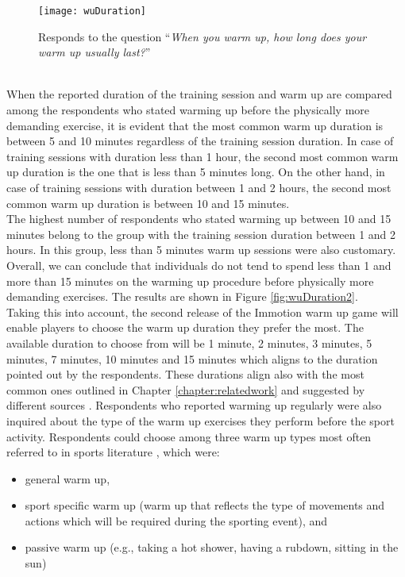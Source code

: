  \begin{figure}[h]
    \centering
    \texttt{[image: wuDuration]}
    \caption{ Responds to the question ``\textit{When you warm up, how long does your warm up usually last?}''}
    \label{fig:wuDuration}
\end{figure}\\When the reported duration of the training session and warm up are compared among the respondents who stated warming up before the physically more demanding exercise, it is evident that the most common warm up duration is between 5 and 10 minutes regardless of the training session duration. In case of training sessions with duration less than 1 hour, the second most common warm up duration is the one that is less than 5 minutes long. On the other hand, in case of training sessions with duration between 1 and 2 hours, the second most common warm up duration is between 10 and 15 minutes. \\The highest number of respondents who stated warming up between 10 and 15 minutes belong to the group with the training session duration between 1 and 2 hours. In this group, less than 5 minutes warm up sessions were also customary. Overall, we can conclude that individuals do not tend to spend less than 1 and more than 15 minutes on the warming up procedure before physically more demanding exercises. The results are shown in Figure \ref{fig:wuDuration2}.\\Taking this into account, the second release of the Immotion warm up game will enable players to choose the warm up duration they prefer the most. The available duration to choose from will be 1 minute, 2 minutes, 3 minutes, 5 minutes, 7 minutes, 10 minutes and 15 minutes which aligns to the duration pointed out by the respondents. These durations align also with the most common ones outlined in Chapter \ref{chapter:relatedwork} and suggested by different sources \cite{bishop2003warm2}. Respondents who reported warming up regularly were also inquired about the type of the warm up exercises they perform before the sport activity. Respondents could choose among three warm up types most often referred to in sports literature \cite{shellock1985warming, bishop2003warm2}, which were: 
\begin{itemize}
\item general warm up,
\item sport specific warm up (warm up that reflects the type of movements and actions which will be required during the sporting event), and 
\item passive warm up (e.g., taking a hot shower, having a rubdown, sitting in the sun)
\end{itemize} 
